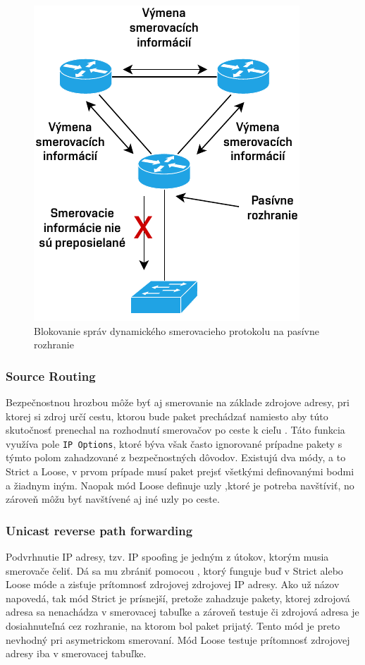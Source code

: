 \begin{figure}[H]
	\begin{center}
		\includegraphics[scale=1]{obrazky/passive-interface.pdf}
	\end{center}
	\caption[Blokovanie správ dynamického smerovacieho protokolu na pasívne rozhranie]{Blokovanie správ dynamického smerovacieho protokolu na pasívne rozhranie}
	\label{fig:passive-int}
\end{figure} 

\subsubsection*{Source Routing}
Bezpečnostnou hrozbou môže byť aj smerovanie na základe zdrojove adresy, pri ktorej si zdroj určí cestu, ktorou bude paket prechádzať namiesto aby túto skutočnosť prenechal na rozhodnutí smerovačov po ceste k cieľu \cite{CIS_DrTLsgXv24lxeIIM}. Táto funkcia využíva pole \texttt{IP Options}, ktoré býva však často ignorované prípadne pakety s týmto polom zahadzované z bezpečnostných dôvodov. Existujú dva módy, a to Strict a Loose, v prvom prípade musí paket prejsť všetkými definovanými bodmi a žiadnym iným. Naopak mód Loose definuje uzly ,ktoré je potreba navštíviť, no zároveň môžu byť navštívené aj iné uzly po ceste.  

\subsubsection*{Unicast reverse path forwarding}
Podvrhnutie IP adresy, tzv. IP spoofing je jedným z útokov, ktorým musia smerovače čeliť. Dá sa mu zbrániť pomocou  \cite{Jackson2010}, ktorý funguje buď v Strict alebo Loose móde a zisťuje prítomnosť zdrojovej zdrojovej IP adresy. Ako už názov napovedá, tak mód Strict je prísnejší, pretože zahadzuje pakety, ktorej zdrojová adresa sa nenachádza v smerovacej tabuľke a zároveň testuje či zdrojová adresa je dosiahnuteľná cez rozhranie, na ktorom bol paket prijatý. Tento mód je preto nevhodný pri asymetrickom smerovaní. Mód Loose testuje prítomnosť zdrojovej adresy iba v smerovacej tabuľke. 

